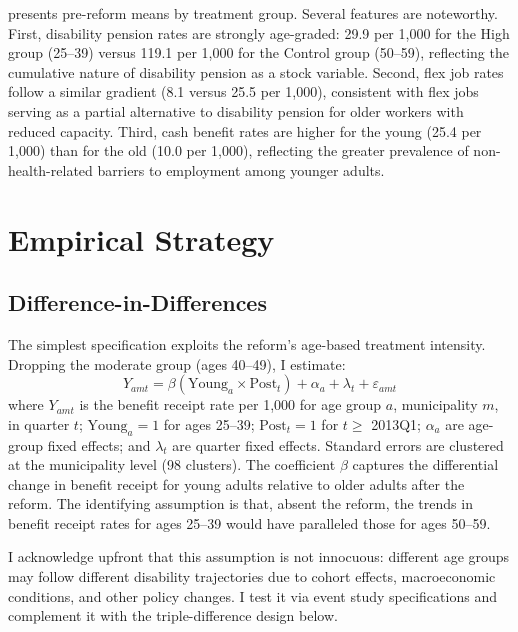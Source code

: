 \documentclass[12pt]{article}
\begin{document}
 presents pre-reform means by treatment group. Several features are noteworthy. First, disability pension rates are strongly age-graded: 29.9 per 1,000 for the High group (25--39) versus 119.1 per 1,000 for the Control group (50--59), reflecting the cumulative nature of disability pension as a stock variable. Second, flex job rates follow a similar gradient (8.1 versus 25.5 per 1,000), consistent with flex jobs serving as a partial alternative to disability pension for older workers with reduced capacity. Third, cash benefit rates are higher for the young (25.4 per 1,000) than for the old (10.0 per 1,000), reflecting the greater prevalence of non-health-related barriers to employment among younger adults.


\section{Empirical Strategy}
\label{sec:strategy}

\subsection{Difference-in-Differences}

The simplest specification exploits the reform's age-based treatment intensity. Dropping the moderate group (ages 40--49), I estimate:
\begin{equation}
Y_{amt} = \beta(\text{Young}_a \times \text{Post}_t) + \alpha_a + \lambda_t + \varepsilon_{amt}
\label{eq:dd}
\end{equation}
where $Y_{amt}$ is the benefit receipt rate per 1,000 for age group $a$, municipality $m$, in quarter $t$; $\text{Young}_a = 1$ for ages 25--39; $\text{Post}_t = 1$ for $t \geq$ 2013Q1; $\alpha_a$ are age-group fixed effects; and $\lambda_t$ are quarter fixed effects. Standard errors are clustered at the municipality level (98 clusters). The coefficient $\beta$ captures the differential change in benefit receipt for young adults relative to older adults after the reform. The identifying assumption is that, absent the reform, the trends in benefit receipt rates for ages 25--39 would have paralleled those for ages 50--59.

I acknowledge upfront that this assumption is not innocuous: different age groups may follow different disability trajectories due to cohort effects, macroeconomic conditions, and other policy changes. I test it via event study specifications and complement it with the triple-difference design below.
\end{document}
